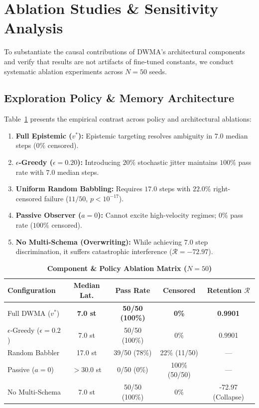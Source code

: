 \documentclass[10pt,twocolumn,a4paper]{article}
\begin{document}
\section{Ablation Studies \& Sensitivity Analysis}
To substantiate the causal contributions of DWMA's architectural components and verify that results are not artifacts of fine-tuned constants, we conduct systematic ablation experiments across $N = 50$ seeds.

\subsection{Exploration Policy \& Memory Architecture}
Table~\ref{tab:ablation} presents the empirical contrast across policy and architectural ablations:
\begin{enumerate}
  \item \textbf{Full Epistemic ($v^*$):} Epistemic targeting resolves ambiguity in $7.0$ median steps ($0\%$ censored).
  \item \textbf{$\epsilon$-Greedy ($\epsilon = 0.20$):} Introducing $20\%$ stochastic jitter maintains $100\%$ pass rate with $7.0$ median steps.
  \item \textbf{Uniform Random Babbling:} Requires $17.0$ steps with $22.0\%$ right-censored failure ($11/50$, $p < 10^{-17}$).
  \item \textbf{Passive Observer ($a = 0$):} Cannot excite high-velocity regimes; $0\%$ pass rate ($100\%$ censored).
  \item \textbf{No Multi-Schema (Overwriting):} While achieving $7.0$ step discrimination, it suffers catastrophic interference ($\mathcal{R} = -72.97$).
\end{enumerate}

\begin{table}[h]
\centering
\scriptsize
\caption{\textbf{Component \& Policy Ablation Matrix ($N = 50$)}}
\label{tab:ablation}
\begin{tabular}{lcccc}
\toprule
\textbf{Configuration} & \textbf{Median Lat.} & \textbf{Pass Rate} & \textbf{Censored} & \textbf{Retention $\mathcal{R}$} \\
\midrule
Full DWMA ($v^*$) & \textbf{7.0 st} & \textbf{50/50 (100\%)} & \textbf{0\%} & \textbf{0.9901} \\
$\epsilon$-Greedy ($\epsilon=0.2$) & 7.0 st & 50/50 (100\%) & 0\% & 0.9901 \\
Random Babbler & 17.0 st & 39/50 (78\%) & 22\% (11/50) & --- \\
Passive ($a = 0$) & $>30.0$ st & 0/50 (0\%) & 100\% (50/50) & --- \\
No Multi-Schema & 7.0 st & 50/50 (100\%) & 0\% & -72.97 (Collapse) \\
\bottomrule
\end{tabular}
\end{table}
\end{document}
